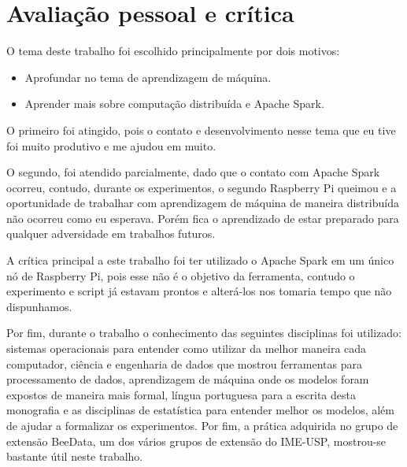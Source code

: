 
\chapter{Avaliação pessoal e crítica}
\label{cap:avaliacao_pessoal}

O tema deste trabalho foi escolhido principalmente por dois motivos:

\begin{itemize}
    \item Aprofundar no tema de aprendizagem de máquina.
    \item Aprender mais sobre computação distribuída e Apache Spark.
\end{itemize}

O primeiro foi atingido, pois o contato e desenvolvimento nesse tema que eu tive
foi muito produtivo e me ajudou em muito.

O segundo, foi atendido parcialmente, dado que o contato com Apache Spark ocorreu,
contudo, durante os experimentos, o segundo Raspberry Pi queimou e a oportunidade de 
trabalhar com aprendizagem de máquina de maneira distribuída não ocorreu como eu 
esperava. Porém fica o aprendizado de estar preparado para qualquer adversidade em
trabalhos futuros.

A crítica principal a este trabalho foi ter utilizado o Apache Spark em um único nó 
de Raspberry Pi, pois esse não é o objetivo da ferramenta, contudo o experimento e 
script já estavam prontos e alterá-los nos tomaria tempo que não dispunhamos. 

Por fim, durante o trabalho o conhecimento das seguintes disciplinas foi utilizado: sistemas
operacionais para entender como utilizar da melhor maneira cada computador, ciência e engenharia
de dados que mostrou ferramentas para processamento de dados, aprendizagem de máquina onde os 
modelos foram expostos de maneira mais formal, língua portuguesa para a escrita desta monografia
e as disciplinas de estatística para entender melhor os modelos, além de ajudar a formalizar os 
experimentos. Por fim, a prática adquirida no grupo de extensão  BeeData, um dos vários grupos 
de extensão do IME-USP, mostrou-se bastante útil neste trabalho.
